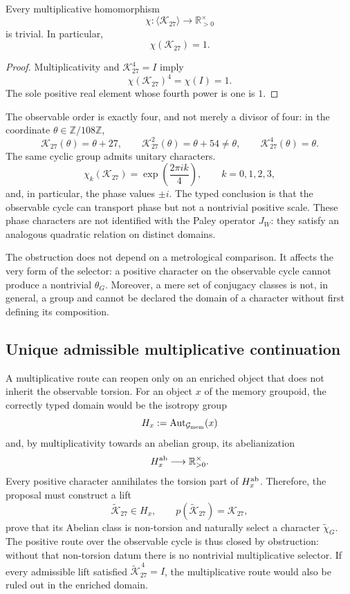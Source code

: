 \begin{theorem}
\label{thm:no-go-chi-G-observable}
Every multiplicative homomorphism
\[
 \chi:\langle\mathcal K_{27}\rangle
 \longrightarrow\mathbb R_{>0}^{\times}
\]
is trivial. In particular,
\[
 \chi(\mathcal K_{27})=1.
\]
\end{theorem}

\begin{proof}
Multiplicativity and \(\mathcal K_{27}^{4}=I\) imply
\[
 \chi(\mathcal K_{27})^4=\chi(I)=1.
\]
The sole positive real element whose fourth power is one is \(1\).
\end{proof}

The observable order is exactly four, and not merely a divisor of four:
in the coordinate \(\theta\in\mathbb Z/108\mathbb Z\),
\[
 \mathcal K_{27}(\theta)=\theta+27,
 \qquad
 \mathcal K_{27}^{2}(\theta)=\theta+54\neq\theta,
 \qquad
 \mathcal K_{27}^{4}(\theta)=\theta.
\]
The same cyclic group admits unitary characters.
\[
 \chi_k(\mathcal K_{27})
 =\exp\!\left(\frac{2\pi i k}{4}\right),
 \qquad k=0,1,2,3,
\]
and, in particular, the phase values \(\pm i\). The typed conclusion is
that the observable cycle can transport phase but not a nontrivial positive
scale. These phase characters are not identified with the Paley operator
\(J_W\): they satisfy an analogous quadratic relation on distinct
domains.

The obstruction does not depend on a metrological comparison. It affects the very
form of the selector: a positive character on the observable cycle cannot
produce a nontrivial \(\theta_G\). Moreover, a mere set of conjugacy
classes is not, in general, a group and cannot be declared the domain
of a character without first defining its composition.

\subsection{Unique admissible multiplicative continuation}

A multiplicative route can reopen only on an enriched object that
does not inherit the observable torsion. For an object \(x\) of the memory groupoid,
the correctly typed domain would be the isotropy group
\[
 H_x:=\operatorname{Aut}_{\mathcal G_{\rm mem}}(x)
\]
and, by multiplicativity towards an abelian group, its abelianization
\[
 H_x^{\rm ab}\longrightarrow\mathbb R_{>0}^{\times}.
\]
Every positive character annihilates the torsion part of \(H_x^{\rm ab}\). Therefore,
the proposal must construct a lift
\[
 \widetilde{\mathcal K}_{27}\in H_x,
 \qquad
 p(\widetilde{\mathcal K}_{27})=\mathcal K_{27},
\]
prove that its Abelian class is non-torsion and naturally select
a character \(\widetilde\chi_G\). The positive route over the observable cycle
is thus closed by obstruction: without that non-torsion datum there is no
nontrivial multiplicative selector. If every admissible lift
satisfied
\(\widetilde{\mathcal K}_{27}^{\,4}=I\), the multiplicative route would also be
ruled out in the enriched domain.

